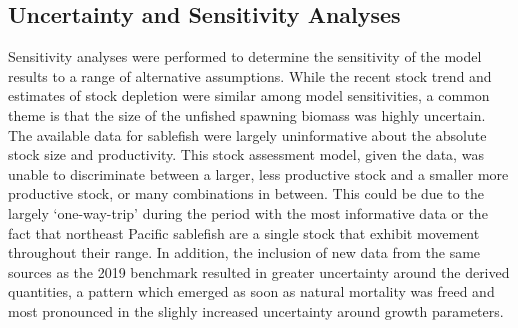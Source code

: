 \documentclass[11pt,
  english,
  a4paper,
]{article}
\begin{document}
\leavevmode\tagmcend\tagstructend\par

\hypertarget{uncertainty-and-sensitivity-analyses}{%
\subsection{Uncertainty and Sensitivity Analyses}\label{uncertainty-and-sensitivity-analyses}}

\leavevmode\tagmcend\tagstructend


Sensitivity analyses were performed to determine the sensitivity of the model results to a range of alternative assumptions. While the recent stock trend and estimates of stock depletion were similar among model sensitivities, a common theme is that the size of the unfished spawning biomass was highly uncertain. The available data for sablefish were largely uninformative about the absolute stock size and productivity. This stock assessment model, given the data, was unable to discriminate between a larger, less productive stock and a smaller more productive stock, or many combinations in between. This could be due to the largely `one-way-trip' during the period with the most informative data or the fact that northeast Pacific sablefish are a single stock that exhibit movement throughout their range. In addition, the inclusion of new data from the same sources as the 2019 benchmark resulted in greater uncertainty around the derived quantities, a pattern which emerged as soon as natural mortality was freed and most pronounced in the slighly increased uncertainty around growth parameters.
\end{document}

